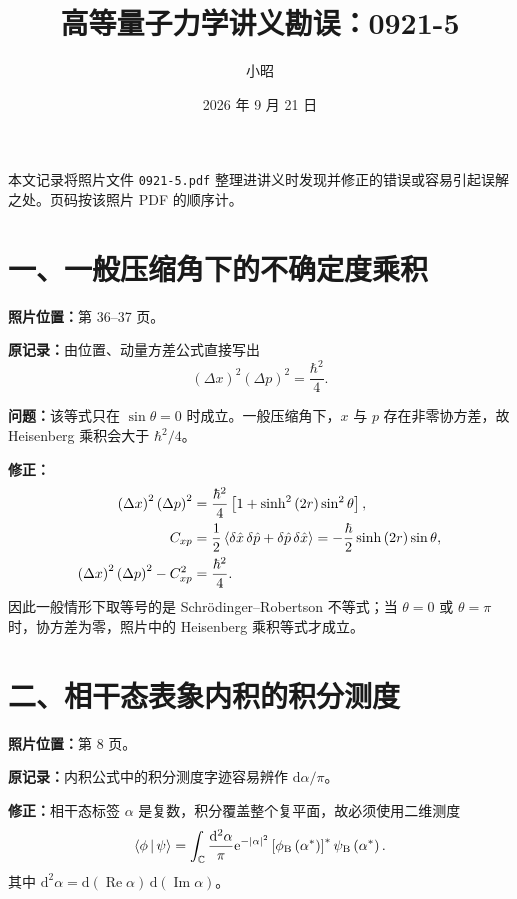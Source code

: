 \documentclass[UTF8,12pt,a4paper,fontset=fandol]{ctexart}
\title{高等量子力学讲义勘误：0921-5}
\author{小昭}
\date{2026 年 9 月 21 日}
\begin{document}
\maketitle

本文记录将照片文件 \texttt{0921-5.pdf} 整理进讲义时发现并修正的错误或容易引起误解之处。页码按该照片 PDF 的顺序计。

\section*{一、一般压缩角下的不确定度乘积}
\textbf{照片位置：}第 36--37 页。

\textbf{原记录：}由位置、动量方差公式直接写出
\begin{equation}
\left(\Delta x\right)^2\left(\Delta p\right)^2=\frac{\hbar^2}{4}.
\end{equation}

\textbf{问题：}该等式只在 $\sin\theta=0$ 时成立。一般压缩角下，$x$ 与 $p$ 存在非零协方差，故 Heisenberg 乘积会大于 $\hbar^2/4$。

\textbf{修正：}
\begin{align}
\left(\Delta x\right)^2\left(\Delta p\right)^2
&=\frac{\hbar^2}{4}\left[1+\sinh^2\left(2r\right)\sin^2\theta\right],\\
C_{xp}&=\frac12\Braket{\delta\hat x\,\delta\hat p+\delta\hat p\,\delta\hat x}
=-\frac{\hbar}{2}\sinh\left(2r\right)\sin\theta,\\
\left(\Delta x\right)^2\left(\Delta p\right)^2-C_{xp}^2
&=\frac{\hbar^2}{4}.
\end{align}
因此一般情形下取等号的是 Schr\"odinger--Robertson 不等式；当 $\theta=0$ 或 $\theta=\pi$ 时，协方差为零，照片中的 Heisenberg 乘积等式才成立。

\section*{二、相干态表象内积的积分测度}
\textbf{照片位置：}第 8 页。

\textbf{原记录：}内积公式中的积分测度字迹容易辨作 $\mathrm{d}\alpha/\pi$。

\textbf{修正：}相干态标签 $\alpha$ 是复数，积分覆盖整个复平面，故必须使用二维测度
\begin{equation}
\Braket{\phi|\psi}=\int_{\mathbb{C}}\frac{\mathrm{d}^2\alpha}{\pi}
\mathrm{e}^{-\left|\alpha\right|^2}
\left[\phi_{\mathrm{B}}\left(\alpha^*\right)\right]^*
\psi_{\mathrm{B}}\left(\alpha^*\right).
\end{equation}
其中 $\mathrm{d}^2\alpha=\mathrm{d}\left(\operatorname{Re}\alpha\right)\,
\mathrm{d}\left(\operatorname{Im}\alpha\right)$。
\end{document}

